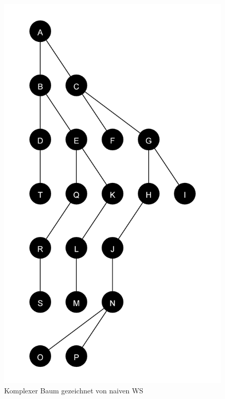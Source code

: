 \begin{figure}[ht]
    \centering
    \includegraphics[scale = 0.18]{abbildungen/komplex_a1}
    \caption{Komplexer Baum gezeichnet von naiven \ac{WS}}
    \label{pic:komplex_a1}
\end{figure}

